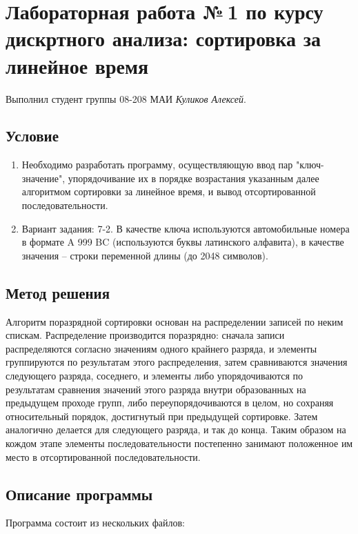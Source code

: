 \documentclass[12pt]{article}
\begin{document}
\section*{Лабораторная работа №\,1 по курсу дискртного анализа: сортировка за линейное время}

Выполнил студент группы 08-208 МАИ \textit{Куликов Алексей}.

\subsection*{Условие}

\begin{enumerate}
\item Необходимо разработать программу, осуществляющую ввод пар "ключ-значение", упорядочивание их в порядке возрастания указанным далее алгоритмом сортировки за линейное время, и вывод отсортированной последовательности.
\item Вариант задания: 7-2. В качестве ключа используются автомобильные номера в формате A 999 BC (используются буквы латинского алфавита), в качестве значения -- строки переменной длины (до 2048 символов). 
\end{enumerate}

\subsection*{Метод решения}

Алгоритм поразрядной сортировки основан на распределении записей по неким спискам. Распределение производится поразрядно: сначала записи распределяются согласно значениям одного крайнего разряда, и элементы группируются по результатам этого распределения, затем сравниваются значения следующего разряда, соседнего, и элементы либо упорядочиваются по результатам сравнения значений этого разряда внутри образованных на предыдущем проходе групп, либо переупорядочиваются в целом, но сохраняя относительный порядок, достигнутый при предыдущей сортировке. Затем аналогично делается для следующего разряда, и так до конца. Таким образом на кождом этапе элементы последовательности постепенно занимают положенное им место в отсортированной последовательности.

\subsection*{Описание программы}

Программа состоит из нескольких файлов:
\end{document}
